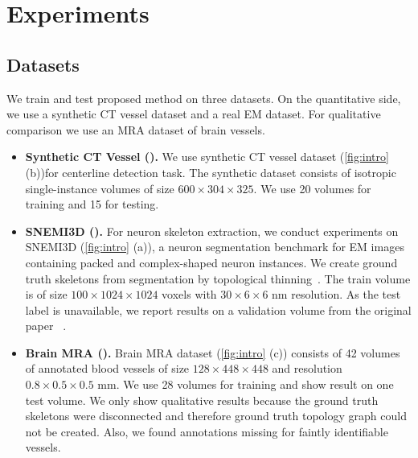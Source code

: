
\chapter{Experiments}\label{chapter:experiments}

\section{Datasets}
We train and test proposed method on three datasets. On the quantitative side, we use a synthetic CT vessel dataset and a real EM dataset. For qualitative comparison we use an MRA dataset of brain vessels.

\begin{itemize}
	\item \textbf{Synthetic CT Vessel (\cite{Tetteh2018}).} We use synthetic CT vessel dataset (\autoref{fig:intro} (b))for centerline detection task. The synthetic dataset consists of isotropic single-instance volumes of size $600\times304\times325$. We use 20 volumes for training and 15 for testing.
	
	\item \textbf{SNEMI3D (\cite{SNEMI3D}).} For neuron skeleton extraction, we conduct experiments on SNEMI3D (\autoref{fig:intro} (a)), a neuron segmentation benchmark for EM images containing packed and complex-shaped neuron instances. We create ground truth skeletons from segmentation by topological thinning~\cite{palagyi2014sequential}. The train volume is of size $100\times1024\times1024$ voxels with $30\times6\times6$ nm resolution. 
	As the test label is unavailable, we report results on a validation volume from the original paper ~\cite{Kasthuri2015}.
	
	\item  \textbf{Brain MRA (\cite{Bullitt2005}).} Brain MRA dataset (\autoref{fig:intro} (c)) consists of 42 volumes of annotated blood vessels of size $128\times448\times448$ and resolution $0.8\times0.5\times0.5$ mm. We use 28 volumes for training and show result on one test volume. We only show qualitative results because the ground truth skeletons were disconnected and therefore ground truth topology graph could not be created. Also, we found annotations missing for faintly identifiable vessels. 
\end{itemize}

